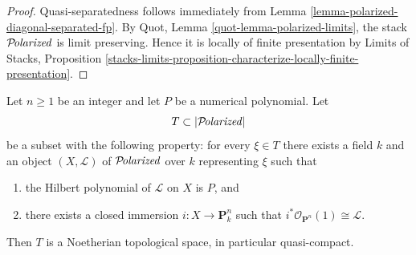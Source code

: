 \begin{proof}
Quasi-separatedness follows immediately from Lemma
\ref{lemma-polarized-diagonal-separated-fp}. By Quot, Lemma
\ref{quot-lemma-polarized-limits}, the stack $\mathcal{P}\!\mathit{olarized}$ is limit
preserving. Hence it is locally of finite presentation by Limits of Stacks,
Proposition
\ref{stacks-limits-proposition-characterize-locally-finite-presentation}.
\end{proof}

\begin{lemma}
\label{lemma-bounded-polarized}
Let $n \geq 1$ be an integer and let $P$ be a numerical polynomial.
Let
$$
T \subset |\mathcal{P}\!\mathit{olarized}|
$$
be a subset with the following property: for every $\xi \in T$
there exists a field $k$ and an object $(X, \mathcal{L})$
of $\mathcal{P}\!\mathit{olarized}$ over $k$ representing $\xi$ such that
\begin{enumerate}
\item the Hilbert polynomial of $\mathcal{L}$ on $X$ is $P$, and
\item there exists a closed immersion $i : X \to \mathbf{P}^n_k$
such that $i^*\mathcal{O}_{\mathbf{P}^n}(1) \cong \mathcal{L}$.
\end{enumerate}
Then $T$ is a Noetherian topological space, in particular quasi-compact.
\end{lemma}

